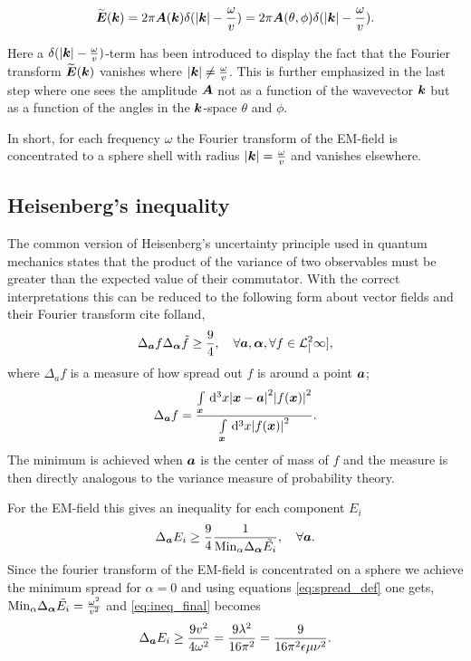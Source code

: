 \documentclass[11pt,a4paper, 
swedish,english %
]{article}
\newcommand{\Lsq}[1]{\ensuremath{\mathcal{L}^2_{#1}}}
\begin{document}
\begin{equation}
  \label{eq:f_transf}
  \widetilde{\vb*E}(\vb*k)=2\pi\vb*A(\vb*k)\delta(\abs{\vb*k}-\frac{\omega}{v})=2\pi\vb*A(\theta,\phi)\delta(\abs{\vb*k}-\frac{\omega}{v}).
\end{equation}

Here a $\delta(\abs{\vb*k}-\frac{\omega}{v})$-term has been introduced to display the fact that the Fourier transform $\widetilde{\vb*E}(\vb*k)$ vanishes where $\abs{\vb*k} \neq\frac{\omega}{v}$.
This is further emphasized in the last step where one sees the amplitude $\vb*A$ not as a function of the wavevector $\vb*k$ but as a function of the angles in the $\vb*k$-space $\theta$ and $\phi$.

In short, for each frequency $\omega$ the Fourier transform of the EM-field is concentrated to a sphere shell with radius $\abs{\vb*k}=\frac{\omega}{v}$ and vanishes elsewhere.

\subsection{Heisenberg's inequality}
The common version of Heisenberg's uncertainty principle used in quantum mechanics states that the product of the variance of two observables must be greater than the expected value of their commutator. With the correct interpretations this can be reduced to the following form about vector fields and their Fourier transform cite folland, 
\begin{equation}
\Delta_{\vb*a}f \Delta_{\vb*\alpha} \tilde{f} \geq \frac{9}{4}, \quad \forall \vb*a, \vb*\alpha, \forall f \in \Lsq[\infty],
\end{equation}
where $\Delta_af$ is a measure of how spread out $f$ is around a point $\vb*a$;
\begin{equation}
  \label{eq:spread_def}
\Delta_{\vb*a}f=\frac{\int_{\vb*x}\id^3x\abs{\vb*x-\vb*a}^2\abs{f(\vb*x)}^2}{\int_{\vb*x}\id^3x\abs{f(\vb*x)}^2}.
\end{equation}
The minimum is achieved when $\vb*a$ is the center of mass of $f$ and the measure is then directly analogous to the variance measure of probability theory.

For the EM-field this gives an inequality for each component $E_i$\footnotemark{}
\begin{equation}
  \label{eq:ineq_final}
  \Delta_{\vb*a}E_i\geq \frac{9}{4} \frac{1}{\mathrm{Min}_\alpha\Delta_{\vb*\alpha}\tilde{E_i}}, \quad \forall \vb*a.
\end{equation}
Since the fourier transform of the EM-field is concentrated on a sphere we achieve the minimum spread for $\alpha=0$ and using equations \ref{eq:spread_def} one gets,
$\mathrm{Min}_\alpha\Delta_{\vb*\alpha}\tilde{E_i}=\frac{\omega^2}{v^2}$ and \ref{eq:ineq_final} becomes
\begin{equation}
 \Delta_{\vb*a}E_i\geq \frac{9v^2}{4\omega^2}=\frac{9\lambda^2}{16\pi^2}=\frac{9}{16\pi^2\epsilon\mu\nu^2}.
 \end{equation}
\end{document}
